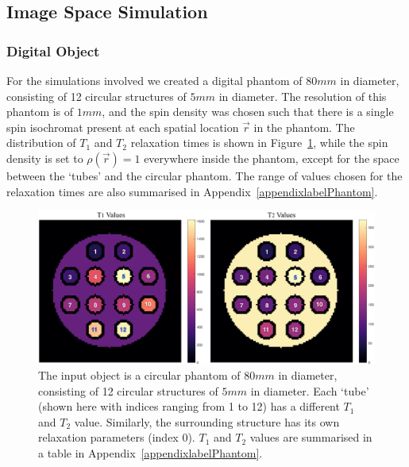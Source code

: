 \hfill

\subsection{Image Space Simulation}
\label{method:imagespace}

\subsubsection{Digital Object}

For the simulations involved we created a digital phantom of $80mm$ in diameter, consisting of 12 circular structures of $5mm$ in diameter.
The resolution of this phantom is of $1mm$, and the spin density was chosen such that there is a single spin isochromat present at each spatial location $\vec{r}$ in the phantom.
The distribution of $T_1$ and $T_2$ relaxation times is shown in Figure~\ref{fig:inputObject}, while the spin density is set to $\rho(\vec{r}) = 1$ everywhere inside the phantom, except for the space between the `tubes' and the circular phantom.
The range of values chosen for the relaxation times are also summarised in Appendix~\ref{appendixlabelPhantom}.

\begin{figure}[ht]
    \centering
    \includegraphics[angle=0,width=1\textwidth, keepaspectratio]{images/mrf/inputObject}
    \caption{The input object is a circular phantom of $80mm$ in diameter, consisting of 12 circular structures of $5mm$ in diameter. Each `tube' (shown here with indices ranging from 1 to 12) has a different $T_1$ and $T_2$ value. Similarly, the surrounding structure has its own relaxation parameters (index 0). $T_1$ and $T_2$ values are summarised in a table in Appendix~\ref{appendixlabelPhantom}.}
    \label{fig:inputObject}
\end{figure}

